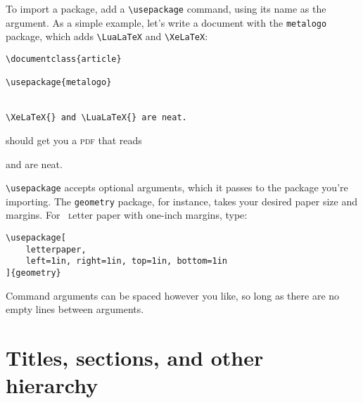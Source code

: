 To import a package, add a \verb|\usepackage| command,
using its name as the argument.
As a simple example, let's write a document with the \texttt{metalogo}
package, which adds \verb|\LuaLaTeX| and \verb|\XeLaTeX|:
\begin{leftfigure}
\begin{lstlisting}
\documentclass{article}

\usepackage{metalogo}


\XeLaTeX{} and \LuaLaTeX{} are neat.

\end{lstlisting}
\end{leftfigure}
\begin{samepage}
should get you a \textsc{pdf} that reads
\begin{leftfigure}
\lm \XeLaTeX{} and \LuaLaTeX{} are neat.
\end{leftfigure}
\end{samepage}
\verb|\usepackage| accepts optional arguments,
which it passes to the package you're importing.
The \texttt{geometry} package, for instance,
takes your desired paper size and margins.
For ~\textsc{l}etter paper with one-inch margins,
type:
\begin{leftfigure}
\begin{lstlisting}
\usepackage[
    letterpaper,
    left=1in, right=1in, top=1in, bottom=1in
]{geometry}
\end{lstlisting}
\end{leftfigure}
Command arguments can be spaced however you like,
so long as there are no empty lines between arguments.

\section{Titles, sections, and other hierarchy}

